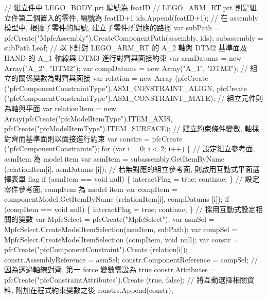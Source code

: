 \documentclass[]{article}
\newenvironment{Shaded}{}{}
\newcommand{\StringTok}[1]{\textcolor[rgb]{0.25,0.44,0.63}{{#1}}}
\begin{document}
\begin{Shaded}
\begin{Highlighting}[]
\StringTok{// 組立件中 LEGO_BODY.prt 編號為 featID}
\StringTok{// LEGO_ARM_RT.prt 則是組立件第二個置入的零件,  編號為 featID+1}
\StringTok{ids.Append(featID+1);}
\StringTok{// 在 assembly 模型中, 根據子零件的編號, 建立子零件所對應的路徑}
\StringTok{var subPath = pfcCreate("MpfcAssembly").CreateComponentPath(assembly, ids);}
\StringTok{subassembly = subPath.Leaf;}
\StringTok{// 以下針對 LEGO_ARM_RT 的 A_2 軸與 DTM2 基準面及 HAND 的  A_1 軸線與 DTM3 進行對齊與面接約束}
\StringTok{var asmDatums = new Array("A_2", "DTM2");}
\StringTok{var compDatums = new Array("A_1", "DTM3");}
\StringTok{// 組立的關係變數為對齊與面接}
\StringTok{var relation = new Array (pfcCreate ("pfcComponentConstraintType").ASM_CONSTRAINT_ALIGN, pfcCreate ("pfcComponentConstraintType").ASM_CONSTRAINT_MATE);}
\StringTok{// 組立元件則為軸與平面}
\StringTok{var relationItem = new Array(pfcCreate("pfcModelItemType").ITEM_AXIS, pfcCreate("pfcModelItemType").ITEM_SURFACE);}
\StringTok{// 建立約束條件變數, 軸採對齊而基準面則以面接進行約束}
\StringTok{var constrs = pfcCreate ("pfcComponentConstraints");}
\StringTok{for (var i = 0; i < 2; i++)}
\StringTok{\{}
\StringTok{                  // 設定組立參考面, asmItem 為 model item}
\StringTok{    var asmItem = subassembly.GetItemByName (relationItem[i], asmDatums [i]);}
\StringTok{                  // 若無對應的組立參考面, 則啟用互動式平面選擇表單 flag}
\StringTok{    if (asmItem == void null)}
\StringTok{    \{}
\StringTok{        interactFlag = true;}
\StringTok{        continue;}
\StringTok{    \}}
\StringTok{                  // 設定零件參考面, compItem 為 model item}
\StringTok{    var compItem = componentModel.GetItemByName (relationItem[i], compDatums [i]);}
\StringTok{    if (compItem == void null)}
\StringTok{    \{}
\StringTok{        interactFlag = true;}
\StringTok{        continue;}
\StringTok{    \}}
\StringTok{                  // 採用互動式設定相關的變數}
\StringTok{    var MpfcSelect = pfcCreate("MpfcSelect");}
\StringTok{    var asmSel = MpfcSelect.CreateModelItemSelection(asmItem, subPath);}
\StringTok{    var compSel = MpfcSelect.CreateModelItemSelection (compItem, void null);}
\StringTok{    var constr = pfcCreate("pfcComponentConstraint").Create (relation[i]);}
\StringTok{    constr.AssemblyReference  = asmSel;}
\StringTok{    constr.ComponentReference = compSel;}
\StringTok{                  // 因為透過軸線對齊, 第一 force 變數需設為 true}
\StringTok{    constr.Attributes = pfcCreate("pfcConstraintAttributes").Create (true, false);}
\StringTok{                  // 將互動選擇相關資料, 附加在程式約束變數之後}
\StringTok{    constrs.Append(constr);}

\end{Highlighting}
\end{Shaded}
\end{document}
